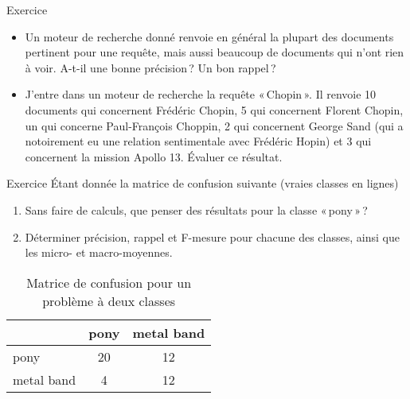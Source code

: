 \documentclass[xcolor={svgnames}, french]{beamer}
\title{\titlepagetitle}
\subtitle{\titlepagesubtitle}
\author{\textbf{\myname} (\mylab)}
\institute{}
\date{\tiny Version {\yyyymmdddate\today}T\currenttime}
\begin{document}

\begin{frame}[plain]
	\titlepage %
\end{frame}


\begin{frame}{Exercice}
	\begin{itemize}
		\item Un moteur de recherche donné renvoie en général la plupart des documents pertinent pour une requête, mais aussi beaucoup de documents qui n'ont rien à voir. A-t-il une bonne précision ? Un bon rappel ?
		\item J'entre dans un moteur de recherche la requête « Chopin ». Il renvoie \num{10} documents qui concernent Frédéric Chopin, \num{5} qui concernent Florent Chopin, un qui concerne Paul-François Choppin, \num{2} qui concernent George Sand (qui a notoirement eu une relation sentimentale avec Frédéric Hopin) et \num{3} qui concernent la mission Apollo 13. Évaluer ce résultat.
	\end{itemize}
\end{frame}

\begin{frame}[fragile=singleslide]{Exercice}
	Étant donnée la matrice de confusion suivante (vraies classes en lignes)
	\begin{enumerate}
		\item Sans faire de calculs, que penser des résultats pour la classe « pony » ?
		\item Déterminer précision, rappel et F-mesure pour chacune des classes, ainsi que les micro- et macro-moyennes.
	\end{enumerate}
	\begin{table}
		\begin{tabu}{|l|*{2}{c|}}
			\hline
						&  pony    & metal band\\
			\hline
			pony        & \num{20} & \num{12}\\
			\hline
			metal band  & \num{4}  & \num{12}\\
			\hline
		\end{tabu}
		\caption{Matrice de confusion pour un problème à deux classes}
	\end{table}

	{\small{}}
\end{frame}

\end{document}
